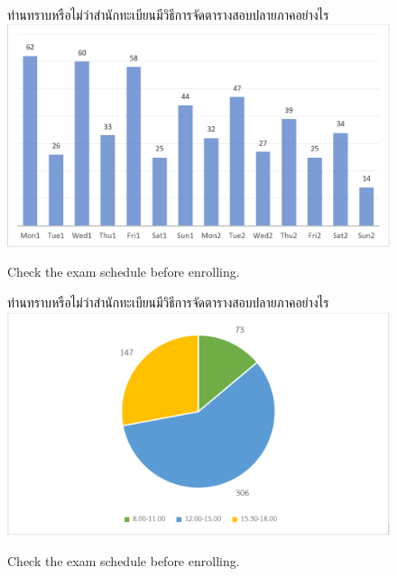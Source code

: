 \begin{figure}
\begin{center}
ท่านทราบหรือไม่ว่าสำนักทะเบียนมีวิธีการจัดตารางสอบปลายภาคอย่างไร
\includegraphics[width=\linewidth]{images/chart.png}
\end{center}
\caption[Poem]{Check the exam schedule before enrolling.}
\label{fig:enroll}     
\end{figure}
\begin{figure}
\begin{center}
ท่านทราบหรือไม่ว่าสำนักทะเบียนมีวิธีการจัดตารางสอบปลายภาคอย่างไร
\includegraphics[width=\linewidth]{images/pie.png}
\end{center}
\caption[Poem]{Check the exam schedule before enrolling.}
\label{fig:enroll}     
\end{figure}
